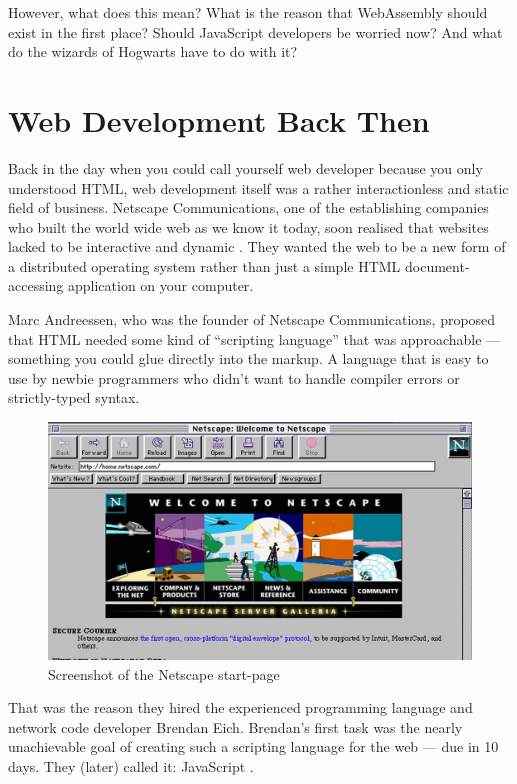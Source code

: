 \documentclass[11pt]{article}
\begin{document}
However, what does this mean? What is the reason that WebAssembly should exist in the first place? Should JavaScript developers be worried now? And what do the wizards of Hogwarts have to do with it?

\section{Web Development Back Then}
\label{sec:back-then}

Back in the day when you could call yourself web developer because you only understood HTML, web development itself was a rather interactionless and static field of business. Netscape Communications, one of the establishing companies who built the world wide web as we know it today, soon realised that websites lacked to be interactive and dynamic \citep{cassel_brendan_2018}. They wanted the web to be a new form of a distributed operating system rather than just a simple HTML document-accessing application on your computer.

Marc Andreessen, who was the founder of Netscape Communications, proposed that HTML needed some kind of “scripting language” that was approachable — something you could glue directly into the markup. A language that is easy to use by newbie programmers who didn’t want to handle compiler errors or strictly-typed syntax.

\begin{figure}[ht]
  \centering
  \includegraphics[width=\textwidth]{figures/002.jpg}
  \caption{Screenshot of the Netscape start-page \citep{npr_home_nodate}}
  \label{fig:netscape}
\end{figure}

That was the reason they hired the experienced programming language and network code developer Brendan Eich. Brendan’s first task was the nearly unachievable goal of creating such a scripting language for the web — due in 10 days. They (later) called it: JavaScript \citep{severance_javascript_2012}.
\end{document}
